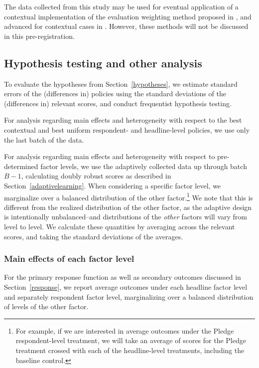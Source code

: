 \documentclass[letterpaper, 12pt, parskip=full,DIV=10]{scrartcl}
\begin{document}
The data collected from this study may be used for eventual application of a contextual implementation of the evaluation weighting method proposed in \cite{hadad2019confidence}, and advanced for contextual cases in \cite{zhan2020retrospective}. However, these methods will not be discussed in this pre-registration. 


\subsection{Hypothesis testing and other analysis}
To evaluate the hypotheses from Section~\ref{hypotheses}, we estimate standard errors of the (differences in) policies using the standard deviations of the (differences in) relevant scores, and conduct frequentist hypothesis testing. 

For analysis regarding main effects and heterogeneity with respect to the best contextual and best uniform respondent- and headline-level policies, we use only the last batch of the data. %

For analysis regarding main effects and heterogeneity with respect to pre-determined factor levels, we use the adaptively collected data up through batch $B-1$, calculating doubly robust scores as described in Section~\ref{adaptivelearning}. When considering a specific factor level, we marginalize over a balanced distribution of the other factor.\footnote{For example, if we are interested in average outcomes under the Pledge respondent-level treatment, we will take an average of scores for the Pledge treatment crossed with each of the headline-level treatments, including the baseline control.} %
We note that this is different from the realized distribution of the other factor, as the adaptive design is intentionally unbalanced--and distributions of the \textit{other} factors will vary from level to level. We calculate these quantities by averaging across the relevant scores, and taking the standard deviations of the averages. 

\subsubsection{Main effects of each factor level}\label{main}
For the primary response function as well as secondary outcomes discussed in Section~\ref{response}, we report average outcomes under each headline factor level and separately respondent factor level, marginalizing over a balanced distribution of levels of the other factor.
\end{document}
